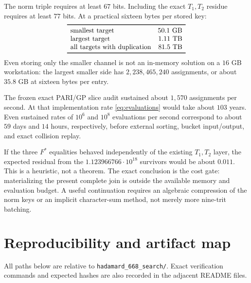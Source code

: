 \documentclass[11pt]{article}
\theoremstyle{remark}
\begin{document}
The norm triple requires at least $67$ bits.  Including the exact
$T_1,T_2$ residue requires at least $77$ bits.  At a practical sixteen
bytes per stored key:
\[
\begin{array}{lr}
\toprule
\text{smallest target}&50.1\ \text{GB}\\
\text{largest target}&1.11\ \text{TB}\\
\text{all targets with duplication}&81.5\ \text{TB}\\
\bottomrule
\end{array}
\]
Even storing only the smaller channel is not an in-memory solution on a
$16$ GB workstation: the largest smaller side has
$2{,}238{,}465{,}240$ assignments, or about $35.8$ GB at sixteen bytes
per entry.

The frozen exact PARI/GP slice audit sustained about $1{,}570$ assignments
per second.  At that implementation rate \eqref{eq:evaluations} would take
about $103$ years.  Even sustained rates of $10^6$ and $10^8$ evaluations
per second correspond to about $59$ days and $14$ hours, respectively,
before external sorting, bucket input/output, and exact collision replay.

If the three $F^*$ equalities behaved independently of the existing
$T_1,T_2$ layer, the expected residual from the
$1.123966766\cdot10^{18}$ survivors would be about $0.011$.  This is a
heuristic, not a theorem.  The exact conclusion is the cost gate:
materializing the present complete join is outside the available memory
and evaluation budget.  A useful continuation requires an algebraic
compression of the norm keys or an implicit character-sum method, not
merely more nine-trit batching.

\section{Reproducibility and artifact map}
\label{sec:repro}

All paths below are relative to \texttt{hadamard\_668\_search/}.  Exact
verification commands and expected hashes are also recorded in the
adjacent README files.
\end{document}
